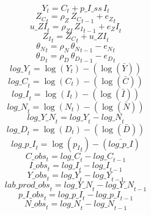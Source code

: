 \begin{dmath}
{{Y}}_{t}={{C}}_{t}+{p\_I\_ss}\, {{I}}_{t}
\end{dmath}
\begin{dmath}
{{Z_C}}_{t}={{\rho_Z}}\, {{Z_C}}_{t-1}+{{e_Z}}_{t}
\end{dmath}
\begin{dmath}
{u\_ZI}_{t}={{\rho_{ZI}}}\, {{Z_I}}_{t-1}+{{e_ZI}}_{t}
\end{dmath}
\begin{dmath}
{{Z_I}}_{t}={{Z_C}}_{t}+{u\_ZI}_{t}
\end{dmath}
\begin{dmath}
{{\theta_N}}_{t}={{\rho_N}}\, {{\theta_N}}_{t-1}-{{e_N}}_{t}
\end{dmath}
\begin{dmath}
{{\theta_D}}_{t}={{\rho_D}}\, {{\theta_D}}_{t-1}-{{e_D}}_{t}
\end{dmath}
\begin{dmath}
{log\_Y}_{t}=\log\left({{Y}}_{t}\right)-(\log\left(\bar{{Y}}\right))
\end{dmath}
\begin{dmath}
{log\_C}_{t}=\log\left({{C}}_{t}\right)-(\log\left(\bar{{C}}\right))
\end{dmath}
\begin{dmath}
{log\_I}_{t}=\log\left({{I}}_{t}\right)-(\log\left(\bar{{I}}\right))
\end{dmath}
\begin{dmath}
{log\_N}_{t}=\log\left({{N}}_{t}\right)-(\log\left(\bar{{N}}\right))
\end{dmath}
\begin{dmath}
{log\_Y\_N}_{t}={log\_Y}_{t}-{log\_N}_{t}
\end{dmath}
\begin{dmath}
{log\_D}_{t}=\log\left({{D}}_{t}\right)-(\log\left(\bar{{D}}\right))
\end{dmath}
\begin{dmath}
{log\_p\_I}_{t}=\log\left({{p_I}}_{t}\right)-(\bar{log\_p\_I})
\end{dmath}
\begin{dmath}
{C\_obs}_{t}={log\_C}_{t}-{log\_C}_{t-1}
\end{dmath}
\begin{dmath}
{I\_obs}_{t}={log\_I}_{t}-{log\_I}_{t-1}
\end{dmath}
\begin{dmath}
{Y\_obs}_{t}={log\_Y}_{t}-{log\_Y}_{t-1}
\end{dmath}
\begin{dmath}
{lab\_prod\_obs}_{t}={log\_Y\_N}_{t}-{log\_Y\_N}_{t-1}
\end{dmath}
\begin{dmath}
{p\_I\_obs}_{t}={log\_p\_I}_{t}-{log\_p\_I}_{t-1}
\end{dmath}
\begin{dmath}
{N\_obs}_{t}={log\_N}_{t}-{log\_N}_{t-1}
\end{dmath}
